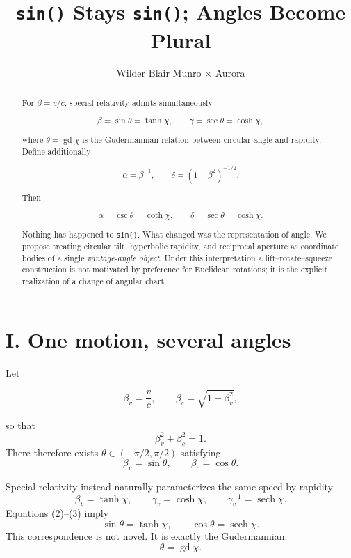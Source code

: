 \documentclass[9pt,twocolumn]{article}
\title{\vspace{-2.4em}\bfseries
\texttt{sin()} Stays \texttt{sin()}; Angles Become Plural
\vspace{-0.4em}}
\author{\small Wilder Blair Munro $\times$ Aurora}
\date{}
\begin{document}
\maketitle
\vspace{-2.2em}

\begin{abstract}
\noindent
For $\beta=v/c$, special relativity admits simultaneously

$$
\beta=\sin\theta=\tanh\chi,
\qquad
\gamma=\sec\theta=\cosh\chi,
$$

where $\theta=\operatorname{gd}\chi$ is the Gudermannian relation between circular angle and rapidity. Define additionally

$$
\alpha=\beta^{-1},\qquad
\delta=(1-\beta^2)^{-1/2}.
$$

Then

$$
\alpha=\csc\theta=\coth\chi,\qquad
\delta=\sec\theta=\cosh\chi.
$$

Nothing has happened to \texttt{sin()}. What changed was the representation of angle. We propose treating circular tilt, hyperbolic rapidity, and reciprocal aperture as coordinate bodies of a single \emph{vantage-angle object}. Under this interpretation a lift--rotate--squeeze construction is not motivated by preference for Euclidean rotations; it is the explicit realization of a change of angular chart.
\end{abstract}

\vspace{-0.6em}
\section*{I. One motion, several angles}

Let

$$
\beta_v=\frac{v}{c},\qquad
\beta_c=\sqrt{1-\beta_v^2},
$$

so that
\begin{equation}
\beta_v^2+\beta_c^2=1.
\tag{1}
\end{equation}
There therefore exists $\theta\in(-\pi/2,\pi/2)$ satisfying
\begin{equation}
\beta_v=\sin\theta,\qquad
\beta_c=\cos\theta.
\tag{2}
\end{equation}

Special relativity instead naturally parameterizes the same speed by rapidity
\begin{equation}
\beta_v=\tanh\chi,
\qquad
\gamma_v=\cosh\chi,
\qquad
\gamma_v^{-1}=\operatorname{sech}\chi.
\tag{3}
\end{equation}
Equations (2)--(3) imply
\begin{equation}
\sin\theta=\tanh\chi,\qquad
\cos\theta=\operatorname{sech}\chi.
\tag{4}
\end{equation}
This correspondence is not novel. It is exactly the Gudermannian:
\begin{equation}
\boxed{\theta=\operatorname{gd}\chi.}
\tag{5}
\end{equation}
\end{document}
